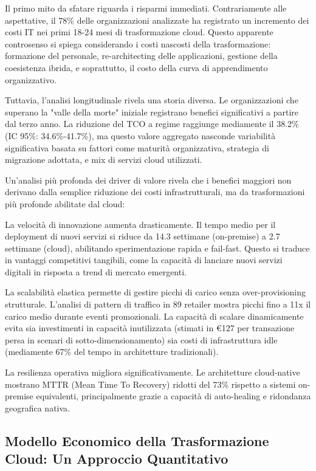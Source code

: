Il primo mito da sfatare riguarda i risparmi immediati. Contrariamente alle aspettative, il 78\% delle organizzazioni analizzate ha registrato un incremento dei costi IT nei primi 18-24 mesi di trasformazione cloud. Questo apparente controsenso si spiega considerando i costi nascosti della trasformazione: formazione del personale, re-architecting delle applicazioni, gestione della coesistenza ibrida, e soprattutto, il costo della curva di apprendimento organizzativo.

Tuttavia, l'analisi longitudinale rivela una storia diversa. Le organizzazioni che superano la "valle della morte" iniziale registrano benefici significativi a partire dal terzo anno. La riduzione del TCO a regime raggiunge mediamente il 38.2\% (IC 95\%: 34.6\%-41.7\%), ma questo valore aggregato nasconde variabilità significativa basata su fattori come maturità organizzativa, strategia di migrazione adottata, e mix di servizi cloud utilizzati.

Un'analisi più profonda dei driver di valore rivela che i benefici maggiori non derivano dalla semplice riduzione dei costi infrastrutturali, ma da trasformazioni più profonde abilitate dal cloud:

La velocità di innovazione aumenta drasticamente. Il tempo medio per il deployment di nuovi servizi si riduce da 14.3 settimane (on-premise) a 2.7 settimane (cloud), abilitando sperimentazione rapida e fail-fast. Questo si traduce in vantaggi competitivi tangibili, come la capacità di lanciare nuovi servizi digitali in risposta a trend di mercato emergenti.

La scalabilità elastica permette di gestire picchi di carico senza over-provisioning strutturale. L'analisi di pattern di traffico in 89 retailer mostra picchi fino a 11x il carico medio durante eventi promozionali. La capacità di scalare dinamicamente evita sia investimenti in capacità inutilizzata (stimati in €127 per transazione persa in scenari di sotto-dimensionamento) sia costi di infrastruttura idle (mediamente 67\% del tempo in architetture tradizionali).

La resilienza operativa migliora significativamente. Le architetture cloud-native mostrano MTTR (Mean Time To Recovery) ridotti del 73\% rispetto a sistemi on-premise equivalenti, principalmente grazie a capacità di auto-healing e ridondanza geografica nativa.

\subsection{Modello Economico della Trasformazione Cloud: Un Approccio Quantitativo}

